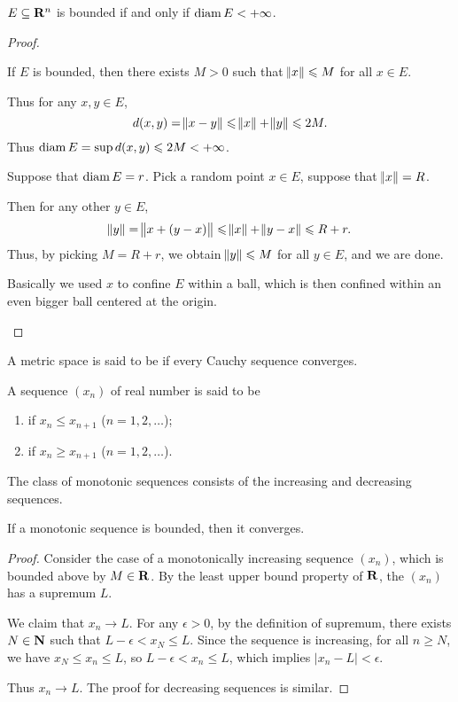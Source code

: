 \begin{proposition}
$E\subseteq\mathbf R^n$ is bounded if and only if $\operatorname{diam} E<+\infty$.
\end{proposition}

\begin{proof} \

\fbox{$\implies$} If $E$ is bounded, then there exists $M>0$ such that $\norm{x}\leqslant M$ for all $x \in E$.

Thus for any $x,y \in E$,
\[ d(x,y)=\norm{x-y}\leqslant\norm{x}+\norm{y}\leqslant2M. \]
Thus $\operatorname{diam} E = \sup d(x,y) \leqslant 2M<+\infty$.

\fbox{$\impliedby$} Suppose that $\operatorname{diam} E=r$. Pick a random point $x\in E$, suppose that $\norm{x}=R$.

Then for any other $y \in E$,
\[ \norm{y}=\norm{x+(y-x)}\leqslant\norm{x}+\norm{y-x}\leqslant R+r. \]
Thus, by picking $M=R+r$, we obtain $\norm{y}\leqslant M$ for all $y \in E$, and we are done.

\begin{remark}
Basically we used $x$ to confine $E$ within a ball, which is then confined within an even bigger ball centered at the origin.
\end{remark}
\end{proof}

\begin{definition}
A metric space is said to be  if every Cauchy sequence converges.
\end{definition}

\begin{definition}
A sequence $(x_n)$ of real number is said to be
\begin{enumerate}[label=(\roman*)]
\item {} if $x_n\le x_{n+1}$ ($n=1,2,\dots$);
\item {} if $x_n\ge x_{n+1}$ ($n=1,2,\dots$).
\end{enumerate}
The class of monotonic sequences consists of the increasing and decreasing sequences.
\end{definition}

\begin{theorem}
If a monotonic sequence is bounded, then it converges.
\end{theorem}

\begin{proof}
Consider the case of a monotonically increasing sequence $(x_n)$, which is bounded above by $M\in\mathbf R$. By the least upper bound property of $\mathbf R$, the $(x_n)$ has a supremum $L$.

We claim that $x_n\to L$. For any $\epsilon>0$, by the definition of supremum, there exists $N\in\mathbf N$ such that $L-\epsilon<x_N\le L$. Since the sequence is increasing, for all $n\ge N$, we have $x_N\le x_n\le L$, so $L-\epsilon<x_n\le L$, which implies $|x_n-L|<\epsilon$.

Thus $x_n\to L$. The proof for decreasing sequences is similar.
\end{proof}

